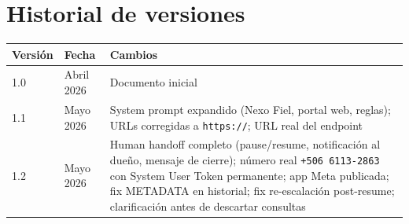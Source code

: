 \documentclass[12pt,a4paper]{article}
\begin{document}
\section*{Historial de versiones}
\begin{table}[H]
\centering
\begin{tabular}{@{}lll@{}}
\toprule
\textbf{Versión} & \textbf{Fecha} & \textbf{Cambios} \\
\midrule
1.0 & Abril 2026 & Documento inicial \\
1.1 & Mayo 2026 & System prompt expandido (Nexo Fiel, portal web, reglas); URLs corregidas a \texttt{https://}; URL real del endpoint \\
1.2 & Mayo 2026 & Human handoff completo (pause/resume, notificación al dueño, mensaje de cierre); número real \texttt{+506 6113-2863} con System User Token permanente; app Meta publicada; fix METADATA en historial; fix re-escalación post-resume; clarificación antes de descartar consultas \\
\bottomrule
\end{tabular}
\end{table}
\end{document}
